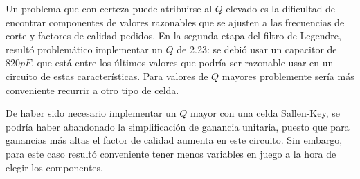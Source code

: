 \documentclass[../../tc_tp5_main.tex]{subfiles}
\begin{document}
Un problema que con certeza puede atribuirse al $Q$ elevado es la dificultad de encontrar componentes de valores razonables que se ajusten a las frecuencias de corte y factores de calidad pedidos. En la segunda etapa del filtro de Legendre, result\'o problem\'atico implementar un $Q$ de 2.23: se debi\'o usar un capacitor de $820pF$, que est\'a entre los \'ultimos valores que podr\'ia ser razonable usar en un circuito de estas caracter\'isticas. Para valores de $Q$ mayores problemente ser\'ia m\'as conveniente recurrir a otro tipo de celda. \par

De haber sido necesario implementar un $Q$ mayor con una celda Sallen-Key, se podr\'ia haber abandonado la simplificaci\'on de ganancia unitaria, puesto que para ganancias m\'as altas el factor de calidad aumenta en este circuito. Sin embargo, para este caso result\'o conveniente tener menos variables en juego a la hora de elegir los componentes. \par
\end{document}
